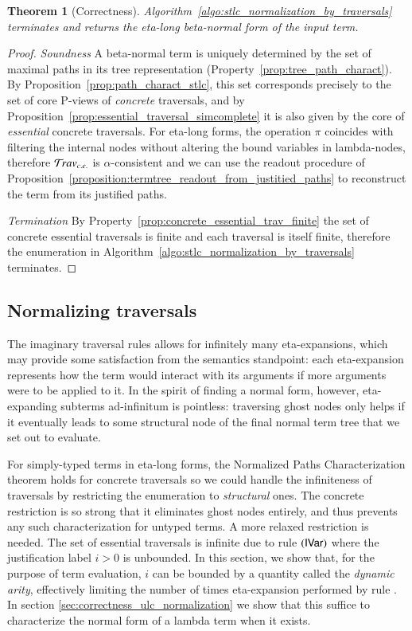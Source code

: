 \documentclass{elsarticle}
\theoremstyle{plain}
\newtheorem{theorem}{Theorem}[section]
\theoremstyle{definition}
\newcommand{\travsetcones}{\travset_{c.e.}} %
\def\coresymbol{\pi} %
\begin{document}
\begin{theorem}[Correctness]
Algorithm~\ref{algo:stlc_normalization_by_traversals} terminates and returns the eta-long beta-normal form of the input term.
\end{theorem}
\begin{proof}
\emph{Soundness} A beta-normal term is uniquely determined by the set of maximal paths in its tree representation (Property~\ref{prop:tree_path_charact}). By Proposition~\ref{prop:path_charact_stlc}, this set corresponds precisely to the set of core P-views of \emph{concrete} traversals,
and by Proposition~\ref{prop:essential_traversal_simcomplete} it is also given by the core of \emph{essential} concrete traversals.
For eta-long forms, the operation $\coresymbol$ coincides with filtering the internal nodes without altering the bound variables in lambda-nodes, therefore $\travsetcones$ is $\alpha$-consistent and we can use the
readout procedure of Proposition~\ref{proposition:termtree_readout_from_justitied_paths} to reconstruct the term
from its justified paths.


\emph{Termination} By Property~\ref{prop:concrete_essential_trav_finite} the set of concrete essential traversals is finite and each traversal is itself finite, therefore the enumeration in Algorithm~\ref{algo:stlc_normalization_by_traversals} terminates.
\end{proof}

\subsection{Normalizing traversals}

The imaginary traversal rules allows for infinitely many eta-expansions, which may provide some satisfaction from the semantics standpoint: each eta-expansion represents how the term would interact with its arguments if more arguments were to be applied to it. In the spirit of finding a normal form, however, eta-expanding subterms ad-infinitum is pointless: traversing ghost nodes only helps if it eventually leads to some structural node of the final normal term tree that we set out to evaluate.

For simply-typed terms in eta-long forms, the
Normalized Paths Characterization theorem holds for concrete traversals so we could  handle the infiniteness of traversals by restricting the enumeration to \emph{structural} ones. The concrete restriction
is so strong that it eliminates ghost nodes entirely, and thus prevents any such characterization for untyped terms. A more relaxed restriction is needed.
The set of essential traversals is infinite due to rule $\mathbf{({\sf IVar})}$ where the justification label $i>0$ is unbounded. In this section, we show that, for the purpose of term evaluation, $i$ can be bounded by a quantity called the \emph{dynamic arity}, effectively limiting the number of times eta-expansion performed by rule . In section \ref{sec:correctness_ulc_normalization} we show that this suffice to characterize the normal form of a lambda term when it exists.
\end{document}
